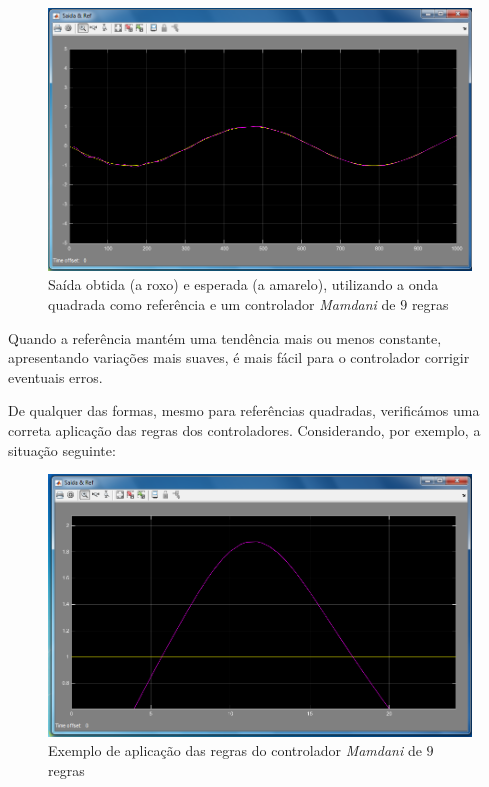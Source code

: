 \documentclass{article}
\begin{document}
\begin{figure}[H]
  \centering
      \includegraphics[scale=0.3]{Images/Mamdani_9_sin.png}
  \caption{Saída obtida (a roxo) e esperada (a amarelo), utilizando a onda quadrada como referência e um controlador \emph{Mamdani} de $9$ regras}
\end{figure}

Quando a referência mantém uma tendência mais ou menos constante, apresentando variações mais suaves, é mais fácil para o controlador corrigir eventuais erros.

De qualquer das formas, mesmo para referências quadradas, verificámos uma correta aplicação das regras dos controladores. Considerando, por exemplo, a situação seguinte:

\begin{figure}[H]
  \centering
      \includegraphics[scale=0.3]{Images/Mamdani_9_square_zoom.png}
  \caption{Exemplo de aplicação das regras do controlador \emph{Mamdani} de $9$ regras}
\end{figure}
\end{document}
